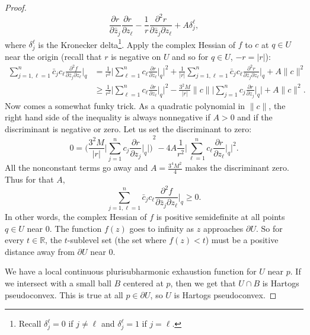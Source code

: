 \documentclass[12pt,openany]{book}
\newcommand{\sabs}[1]{\lvert {#1} \rvert}
\newcommand{\snorm}[1]{\lVert {#1} \rVert}
\newcommand{\BBabs}[1]{\Biggl\lvert {#1} \Biggr\rvert}
\newcommand{\R}{{\mathbb{R}}}
\theoremstyle{plain}
\theoremstyle{remark}
\theoremstyle{definition}
\theoremstyle{exercise}
\theoremstyle{example}
\begin{document}
\begin{proof}
\begin{equation*}
\frac{\partial r}{\partial \bar{z}_j}
\frac{\partial r}{\partial z_\ell}
-
\frac{1}{r}
\frac{\partial^2 r}{\partial \bar{z}_j \partial z_\ell} 
+
A\delta_{j}^{\ell} ,
\end{equation*}
where $\delta_j^\ell$ is the Kronecker delta\footnote{%
Recall $\delta_j^\ell = 0$ if $j\not= \ell$ and $\delta_j^\ell = 1$ if $j =
\ell$.}.
Apply the complex Hessian of $f$ to $c$ at $q \in U$ near the origin
(recall that $r$ is negative on $U$ and so for $q \in U$, $-r = \sabs{r}$):
\begin{equation*}
\begin{split}
\sum_{j=1,\ell=1}^n
\bar{c}_j c_\ell \frac{\partial^2 f}{\partial \bar{z}_j \partial z_\ell} \Big|_q 
& =
\frac{1}{r^2}
\BBabs{
\sum_{\ell=1}^n
c_\ell
\frac{\partial r}{\partial z_\ell} \Big|_q
}^2
+
\frac{1}{\sabs{r}}
\sum_{j=1,\ell=1}^n
\bar{c}_j
c_\ell
\frac{\partial^2 r}{\partial \bar{z}_j \partial z_\ell} \Big|_q
+
A \snorm{c}^2
\\
& \geq
\frac{1}{r^2}
\BBabs{
\sum_{\ell=1}^n
c_\ell
\frac{\partial r}{\partial z_\ell} \Big|_q
}^2
-
\frac{3^2 M}{\sabs{r}}
\snorm{c}\BBabs{\sum_{j=1}^n c_j \frac{\partial r}{\partial z_j} \Big|_q} 
+
A \snorm{c}^2 .
\end{split}
\end{equation*}
Now comes a somewhat funky trick.
As a quadratic polynomial in $\snorm{c}$, the right hand side of the
inequality
is always nonnegative if $A > 0$ and if the discriminant is negative or zero.
Let us set the discriminant to zero:
\begin{equation*}
0 = 
{\Biggl(
\frac{3^2 M}{\sabs{r}}
\BBabs{\sum_{j=1}^n c_j \frac{\partial r}{\partial z_j} \Big|_q}
\Biggr)}^2
- 4A 
\frac{1}{r^2}
\BBabs{
\sum_{\ell=1}^n
c_\ell
\frac{\partial r}{\partial z_\ell} \Big|_q
}^2 .
\end{equation*}
All the nonconstant terms go away and 
$A=\frac{3^4 M^2}{4}$ makes the discriminant zero.  Thus for that $A$,
\begin{equation*}
\sum_{j=1,\ell=1}^n
\bar{c}_j c_\ell \frac{\partial^2 f}{\partial \bar{z}_j \partial z_\ell} \Big|_q 
\geq 0.
\end{equation*}
In other words, the complex Hessian
of $f$ is positive semidefinite at all points $q \in U$ near $0$.
The function $f(z)$ goes to infinity as $z$ approaches $\partial U$.
So for every $t \in \R$, the $t$-sublevel set
(the set where $f(z) < t$) must be a positive
distance away from $\partial U$ near $0$.

We have a local continuous plurisubharmonic
exhaustion function for $U$ near $p$.  If we intersect
with a small ball $B$ centered at $p$, then we get that $U \cap B$ is
Hartogs pseudoconvex.  This is true at all
$p \in \partial U$, so $U$ is Hartogs pseudoconvex.
\end{proof}
\end{document}
